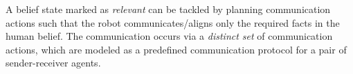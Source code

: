 \documentclass[letterpaper]{article} %
\begin{document}



A belief state marked as \textit{relevant} can be tackled by planning communication actions such that the robot communicates/aligns only the required facts in the human belief.
The communication occurs via a \textit{distinct set} of communication actions, which are modeled as a predefined communication protocol for a pair of sender-receiver agents.





\end{document}
